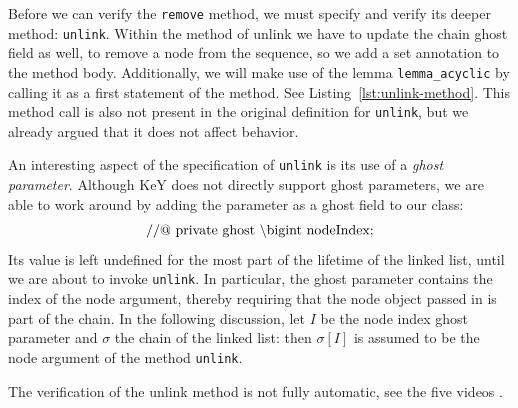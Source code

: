 \documentclass[runningheads]{llncs}
\theoremstyle{remark}
\def\bs{\char092}
\begin{document}
Before we can verify the \texttt{remove} method, we must specify and verify its deeper method: \texttt{unlink}. Within the method of unlink we have to update the chain ghost field as well, to remove a node from the sequence, so we add a set annotation to the method body. Additionally, we will make use of the lemma \texttt{lemma\_acyclic} by calling it as a first statement of the method. See Listing~\ref{lst:unlink-method}. This method call is also not present in the original definition for \texttt{unlink}, but we already argued that it does not affect behavior.



An interesting aspect of the specification of \texttt{unlink} is its use of a \emph{ghost parameter}. Although KeY does not directly support ghost parameters, we are able to work around by adding the parameter as a ghost field to our class:
$$\mathrm{//@\ private\ ghost\ \bs bigint\ nodeIndex;}$$
Its value is left undefined for the most part of the lifetime of the linked list, until we are about to invoke \texttt{unlink}. In particular, the ghost parameter contains the index of the node argument, thereby requiring that the node object passed in is part of the chain. In the following discussion, let $I$ be the node index ghost parameter and $\sigma$ the chain of the linked list: then $\sigma[I]$ is assumed to be the node argument of the method \texttt{unlink}.

The verification of the unlink method is not fully automatic, see the five videos .
\end{document}
